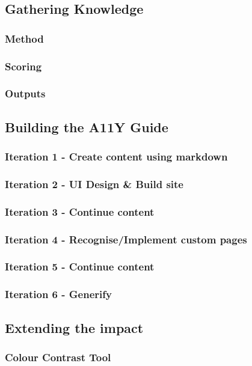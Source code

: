 \subsection{Gathering Knowledge}
\subsubsection{Method}
\subsubsection{Scoring}
\subsubsection{Outputs}

\subsection{Building the A11Y Guide}
\subsubsection{Iteration 1 - Create content using markdown}
\subsubsection{Iteration 2 - UI Design & Build site}
\subsubsection{Iteration 3 - Continue content}
\subsubsection{Iteration 4 - Recognise/Implement custom pages}
\subsubsection{Iteration 5 - Continue content}
\subsubsection{Iteration 6 - Generify}

\subsection{Extending the impact}
\subsubsection{Colour Contrast Tool}
